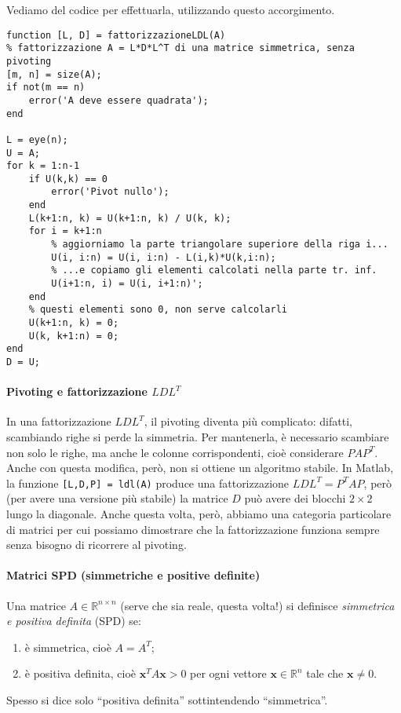 \documentclass[a4paper]{report}
\theoremstyle{definiton}
\theoremstyle{remark}
\begin{document}
Vediamo del codice per effettuarla, utilizzando questo accorgimento.
\begin{lstlisting}
function [L, D] = fattorizzazioneLDL(A)
% fattorizzazione A = L*D*L^T di una matrice simmetrica, senza pivoting
[m, n] = size(A);
if not(m == n)
    error('A deve essere quadrata');
end

L = eye(n);
U = A;     
for k = 1:n-1
    if U(k,k) == 0
        error('Pivot nullo');
    end
    L(k+1:n, k) = U(k+1:n, k) / U(k, k);
    for i = k+1:n
        % aggiorniamo la parte triangolare superiore della riga i...
        U(i, i:n) = U(i, i:n) - L(i,k)*U(k,i:n);
        % ...e copiamo gli elementi calcolati nella parte tr. inf.
        U(i+1:n, i) = U(i, i+1:n)';
    end
    % questi elementi sono 0, non serve calcolarli
    U(k+1:n, k) = 0;
    U(k, k+1:n) = 0;
end
D = U;        
\end{lstlisting}

\paragraph{Pivoting e fattorizzazione $LDL^T$}

In una fattorizzazione $LDL^T$, il pivoting diventa più complicato: difatti, scambiando righe si perde la simmetria. Per mantenerla, è necessario scambiare non solo le righe, ma anche le colonne corrispondenti, cioè considerare $PAP^T$. Anche con questa modifica, però, non si ottiene un algoritmo stabile.
In Matlab, la funzione \lstinline{[L,D,P] = ldl(A)} produce una fattorizzazione $LDL^T = P^TAP$, però (per avere una versione più stabile) la matrice $D$ può avere dei blocchi $2\times 2$ lungo la diagonale. Anche questa volta, però, abbiamo una categoria particolare di matrici per cui possiamo dimostrare che la fattorizzazione funziona sempre senza bisogno di ricorrere al pivoting.

\paragraph{Matrici SPD (simmetriche e positive definite)}

Una matrice $A\in\mathbb{R}^{n\times n}$ (serve che sia reale, questa volta!) si definisce \emph{simmetrica e positiva definita} (SPD) se:
\begin{enumerate}
    \item è simmetrica, cioè $A=A^T$;
    \item è positiva definita, cioè $\mathbf{x}^TA\mathbf{x} > 0$ per ogni vettore $\mathbf{x}\in \mathbb{R}^n$ tale che $\mathbf{x}\neq 0$.
\end{enumerate}
Spesso si dice solo ``positiva definita'' sottintendendo ``simmetrica''.
\end{document}
